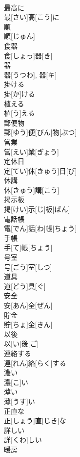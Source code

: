 \documentclass[8pt]{extreport}
\begin{document}
\begin{CJK}{UTF8}{min}
\\	最高に	
\\	最[さい]高[こう]に	
\\	順	
\\	順[じゅん]	
\\	食器	
\\	食[しょっ]器[き]	
\\	器	
\\	器[うつわ], 器[キ]	
\\	掛ける	
\\	掛[か]ける	
\\	植える	
\\	植[う]える	
\\	郵便物	
\\	郵[ゆう]便[びん]物[ぶつ]	
\\	営業	
\\	営[えい]業[ぎょう]	
\\	定休日	
\\	定[てい]休[きゅう]日[び]	
\\	休講	
\\	休[きゅう]講[こう]	
\\	掲示板	
\\	掲[けい]示[じ]板[ばん]	
\\	電話帳	
\\	電[でん]話[わ]帳[ちょう]	
\\	手帳	
\\	手[て]帳[ちょう]	
\\	号室	
\\	号[ごう]室[しつ]	
\\	道具	
\\	道[どう]具[ぐ]	
\\	安全	
\\	安[あん]全[ぜん]	
\\	貯金	
\\	貯[ちょ]金[きん]	
\\	以後	
\\	以[い]後[ご]	
\\	連絡する	
\\	連[れん]絡[らく]する	
\\	濃い	
\\	濃[こ]い	
\\	薄い	
\\	薄[うす]い	
\\	正直な	
\\	正[しょう]直[じき]な	
\\	詳しい	
\\	詳[くわ]しい	
\\	暖房	

\end{CJK}
\end{document}
